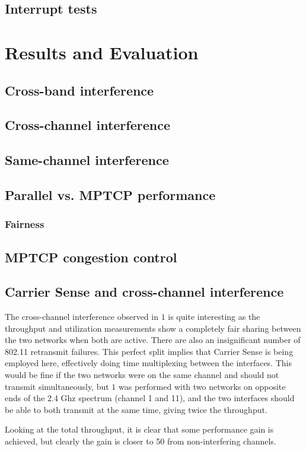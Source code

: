 \documentclass[12pt,a4paper]{article}
\begin{document}
\subsection{Interrupt tests}

\section{Results and Evaluation}
\subsection{Cross-band interference} %
\subsection{Cross-channel interference}
\subsection{Same-channel interference}
\subsection{Parallel vs. MPTCP performance}
\subsubsection{Fairness}
\subsection{MPTCP congestion control}
\subsection{Carrier Sense and cross-channel interference}
The cross-channel interference observed in $1$ is quite interesting as the
throughput and utilization measurements show a completely fair sharing between
the two networks when both are active. There are also an insignificant number of
802.11 retransmit failures. This perfect split implies that Carrier Sense is
being employed here, effectively doing time multiplexing between the interfaces.
This would be fine if the two networks were on the same channel and should not
transmit simultaneously, but $1$ was performed with two networks on opposite
ends of the 2.4 Ghz spectrum (channel 1 and 11), and the two interfaces should
be able to both transmit at the same time, giving twice the throughput.

Looking at the total throughput, it is clear that some performance gain is
achieved, but clearly the gain is closer to 50%
from non-interfering channels.
\end{document}
